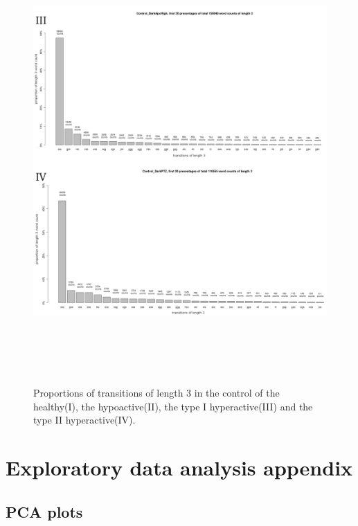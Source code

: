 \begin{figure}[h!]
\begin{center}
\includegraphics[width=15cm,height=17cm]{transitionsperboutlength2.png}
\caption{Proportions of transitions of length 3 in the control of the healthy(I), the hypoactive(II), the type I hyperactive(III) and the type II hyperactive(IV).}
\end{center}
\end{figure}

\section{Exploratory data analysis appendix}

\subsection{PCA plots}





